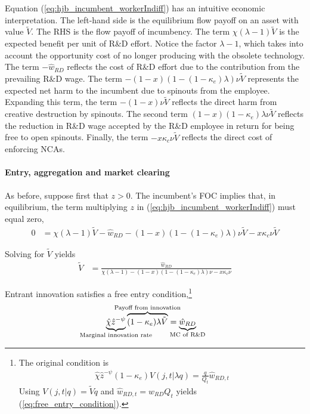 \documentclass[11pt,english]{article}
\begin{document}
Equation (\ref{eq:hjb_incumbent_workerIndiff}) has an intuitive economic interpretation. The left-hand side is the equilibrium flow payoff on an asset with value $\tilde{V}$. The RHS is the flow payoff of incumbency. The term $\chi(\lambda -1) \tilde{V}$ is the expected benefit per unit of R\&D effort. Notice the factor $\lambda -1$, which takes into account the opportunity cost of no longer producing with the obsolete technology. The term $-\hat{w}_{RD}$ reflects the cost of R\&D effort due to the contribution from the prevailing R\&D wage. The term $-(1-x)(1 - (1-\kappa_e) \lambda) \nu \tilde{V}$ represents the expected net harm to the incumbent due to spinouts from the employee. Expanding this term, the term $-(1-x)\nu \tilde{V}$ reflects the direct harm from creative destruction by spinouts. The second term $(1-x)(1-\kappa_e)\lambda \nu \tilde{V}$ reflects the reduction in R\&D wage accepted by the R\&D employee in return for being free to open spinouts. Finally, the term $-x \kappa_c \nu \tilde{V}$ reflects the direct cost of enforcing NCAs.

\paragraph{Entry, aggregation and market clearing}

As before, suppose first that $z > 0$. The incumbent's FOC implies that, in equilibrium, the term multiplying $z$ in (\ref{eq:hjb_incumbent_workerIndiff}) must equal zero,
\begin{align*}
	0 &= \chi(\lambda-1)\tilde{V}- \hat{w}_{RD} - (1-x)(1 - (1-\kappa_e)\lambda) \nu \tilde{V} - x \kappa_c \nu \tilde{V}
\end{align*}

Solving for $\tilde{V}$ yields
\begin{align}
	\tilde{V} &= \frac{\hat{w}_{RD}}{\chi(\lambda - 1) - (1-x) (1- (1-\kappa_e)\lambda)\nu - x \kappa_{c} \nu} \label{eq:hjb_incumbent_foc}
\end{align}

Entrant innovation satisfies a free entry condition,\footnote{The original condition is 
	\begin{align*}
		\hat{\chi} \hat{z}^{-\psi} (1-\kappa_e)  V(j,t|\lambda q) = \frac{q}{Q_t} \hat{w}_{RD,t}
	\end{align*}
	Using $V(j,t|q) = \tilde{V} q$ and $\hat{w}_{RD,t} = \hat{w}_{RD} Q_t$ yields (\ref{eq:free_entry_condition}).}
\begin{align}
	\underbrace{\hat{\chi} \hat{z}^{-\psi}}_{\mathclap{\text{Marginal innovation rate}}} \overbrace{(1-\kappa_e) \lambda \tilde{V}}^{\mathclap{\text{Payoff from innovation}}} &= \underbrace{\hat{w}_{RD}}_{\mathclap{\text{MC of R\&D}}} \label{eq:free_entry_condition}
\end{align}
\end{document}

